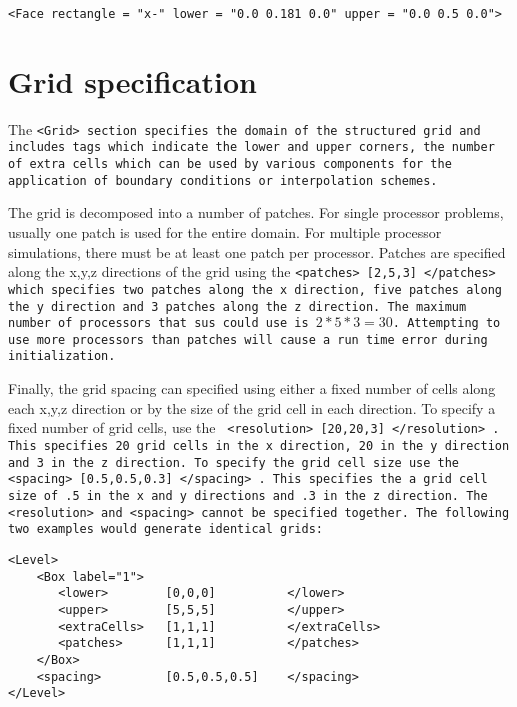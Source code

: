 \begin{Verbatim}[fontsize=\footnotesize]
 <Face rectangle = "x-" lower = "0.0 0.181 0.0" upper = "0.0 0.5 0.0">
\end{Verbatim}

%
\section{Grid specification} \label{Sec:Grid}

The \tt <Grid> \normalfont section specifies the domain of the
structured grid and includes tags which indicate the lower and upper
corners, the number of extra cells which can be used by various
components for the application of boundary conditions or interpolation
schemes.  

The grid is decomposed into a number of patches.  For single processor
problems, usually one patch is used for the entire domain.  For
multiple processor simulations, there must be at least one patch per
processor.  Patches are specified along the x,y,z directions of the
grid using the \tt <patches> [2,5,3] </patches> \normalfont which
specifies two patches along the x direction, five patches along the y
direction and 3 patches along the z direction.  The maximum number of
processors that \tt sus \normalfont could use is $2*5*3 = 30$.
Attempting to use more processors than patches
will cause a run time error during initialization.

Finally, the grid spacing can specified using either a fixed number of
cells along each x,y,z direction or by the size of the grid cell in
each direction.  To specify a fixed number of grid cells, use the \tt
<resolution> [20,20,3] </resolution> \normalfont.  This specifies 20
grid cells in the x direction, 20 in the y direction and 3 in the z
direction.  To specify the grid cell size use the \tt <spacing>
[0.5,0.5,0.3] </spacing> \normalfont.  This specifies the a grid cell
size of .5 in the x and y directions and .3 in the z direction.  The
\tt <resolution> \normalfont and \tt <spacing> \normalfont cannot be
specified together.  The following two examples would generate
identical grids:

\begin{Verbatim}[fontsize=\footnotesize]
<Level>
    <Box label="1">
       <lower>        [0,0,0]          </lower>
       <upper>        [5,5,5]          </upper>
       <extraCells>   [1,1,1]          </extraCells>
       <patches>      [1,1,1]          </patches>
    </Box>
    <spacing>         [0.5,0.5,0.5]    </spacing>
</Level>
\end{Verbatim}

